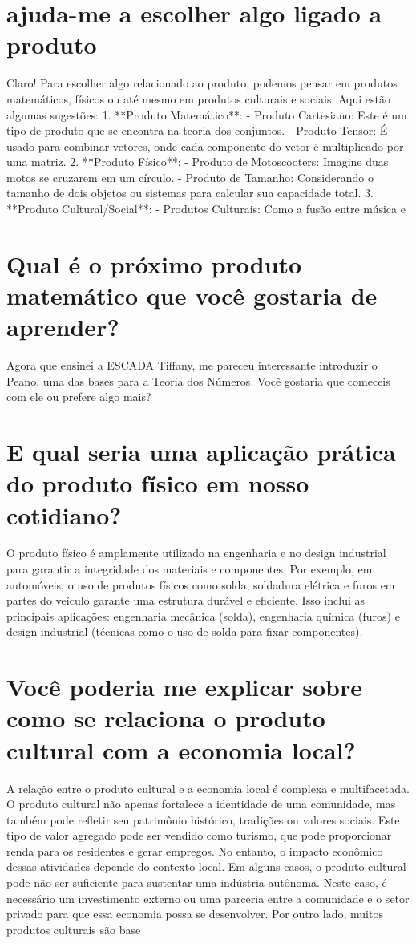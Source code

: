 \documentclass[11pt,a4paper]{article}
\begin{document}
\section{ajuda-me a escolher algo ligado a produto}
Claro! Para escolher algo relacionado ao produto, podemos pensar em produtos matemáticos, físicos ou até mesmo em produtos culturais e sociais. Aqui estão algumas sugestões: 1. **Produto Matemático**: - Produto Cartesiano: Este é um tipo de produto que se encontra na teoria dos conjuntos. - Produto Tensor: É usado para combinar vetores, onde cada componente do vetor é multiplicado por uma matriz. 2. **Produto Físico**: - Produto de Motoscooters: Imagine duas motos se cruzarem em um círculo. - Produto de Tamanho: Considerando o tamanho de dois objetos ou sistemas para calcular sua capacidade total. 3. **Produto Cultural/Social**: - Produtos Culturais: Como a fusão entre música e

\section{Qual é o próximo produto matemático que você gostaria de aprender?}
Agora que ensinei a ESCADA Tiffany, me pareceu interessante introduzir o Peano, uma das bases para a Teoria dos Números. Você gostaria que comeceis com ele ou prefere algo mais?

\section{E qual seria uma aplicação prática do produto físico em nosso cotidiano?}
O produto físico é amplamente utilizado na engenharia e no design industrial para garantir a integridade dos materiais e componentes. Por exemplo, em automóveis, o uso de produtos físicos como solda, soldadura elétrica e furos em partes do veículo garante uma estrutura durável e eficiente. Isso inclui as principais aplicações: engenharia mecânica (solda), engenharia química (furos) e design industrial (técnicas como o uso de solda para fixar componentes).

\section{Você poderia me explicar sobre como se relaciona o produto cultural com a economia local?}
A relação entre o produto cultural e a economia local é complexa e multifacetada. O produto cultural não apenas fortalece a identidade de uma comunidade, mas também pode refletir seu patrimônio histórico, tradições ou valores sociais. Este tipo de valor agregado pode ser vendido como turismo, que pode proporcionar renda para os residentes e gerar empregos. No entanto, o impacto econômico dessas atividades depende do contexto local. Em alguns casos, o produto cultural pode não ser suficiente para sustentar uma indústria autônoma. Neste caso, é necessário um investimento externo ou uma parceria entre a comunidade e o setor privado para que essa economia possa se desenvolver. Por outro lado, muitos produtos culturais são base
\end{document}
